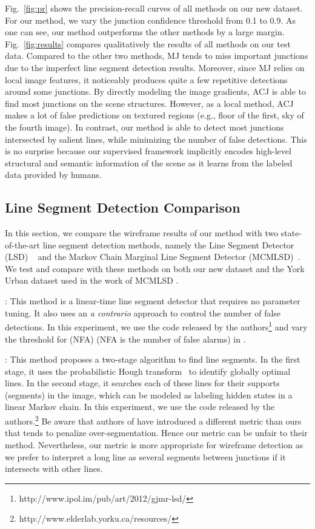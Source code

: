 \documentclass[10pt,twocolumn,letterpaper]{article}
\begin{document}
 Fig.~\ref{fig:pr} shows the precision-recall curves of all methods on our new dataset. For our method, we vary the junction confidence threshold  from 0.1 to 0.9. As one can see, our method outperforms the other methods by a large margin. Fig.~\ref{fig:results} compares qualitatively the results of all methods on our test data. Compared to the other two methods, MJ tends to miss important junctions due to the imperfect line segment detection results. Moreover, since MJ relies on local image features, it noticeably produces quite a few repetitive detections around some junctions. By directly modeling the image gradients, ACJ is able to find most junctions on the scene structures. However, as a local method, ACJ makes a lot of false predictions on textured regions (e.g., floor of the first, sky of the fourth image). In contrast, our method is able to detect most junctions intersected by salient lines, while minimizing the number of false detections. This is no surprise because our supervised framework implicitly encodes high-level structural and semantic information of the scene as it learns from the labeled data provided by humans.


\subsection{Line Segment Detection Comparison}
\label{sec:exp:wireframe}
In this section, we compare the wireframe results of our method with two state-of-the-art line segment detection methods, namely the Line Segment Detector (LSD) ~\cite{von2012lsd} and the Markov Chain Marginal Line Segment Detector (MCMLSD)~\cite{Almazan17}. We test and compare with these methods on both our new dataset and the York Urban dataset \cite{Denis2008EfficientEM} used in the work of MCMLSD \cite{Almazan17}.

: This method is a linear-time line segment detector that requires no parameter tuning. It also uses an \emph{a contrario} approach to control the number of false detections. In this experiment, we use the code released by the authors\footnote{http://www.ipol.im/pub/art/2012/gjmr-lsd/} and vary the threshold for (NFA) (NFA is the number of false alarms) in .



: This method proposes a two-stage algorithm to find line segments. In the first stage, it uses the probabilistic Hough transform~\cite{matas2000robust} to identify globally optimal lines. In the second stage, it searches each of these lines for their supports (segments) in the image, which can be modeled as labeling hidden states in a linear Markov chain. In this experiment, we use the code released by the authors.\footnote{http://www.elderlab.yorku.ca/resources/} Be aware that authors of \cite{Almazan17} have introduced a different metric than ours that tends to penalize over-segmentation. Hence our metric can be unfair to their method. Nevertheless, our metric is more appropriate for wireframe detection as we prefer to interpret a long line as several segments between junctions if it intersects with other lines.
\end{document}
